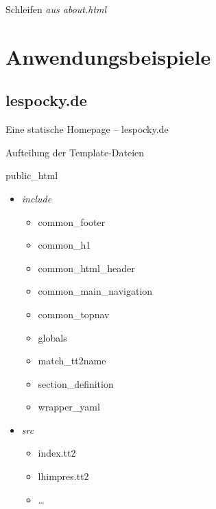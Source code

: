 \documentclass[hyperref={pdfpagelabels=false}]{beamer}
\begin{document}
\begin{frame}{Schleifen}
    \emph{aus about.html}
\end{frame}

\section{Anwendungsbeispiele}

\subsection{lespocky.de}

\begin{frame}{Eine statische Homepage -- lespocky.de}
\end{frame}

\begin{frame}{Aufteilung der Template-Dateien}
    \begin{block}{public\_html}
        \begin{itemize}
            \item \emph{include}
                \begin{itemize}
                    \item common\_footer
                    \item common\_h1
                    \item common\_html\_header
                    \item common\_main\_navigation
                    \item common\_topnav
                    \item globals
                    \item match\_tt2name
                    \item section\_definition
                    \item wrapper\_yaml
                \end{itemize}
            \item \emph{src}
                \begin{itemize}
                    \item index.tt2
                    \item lhimpres.tt2
                    \item \dots
                \end{itemize}
        \end{itemize}
    \end{block}
\end{frame}
\end{document}
